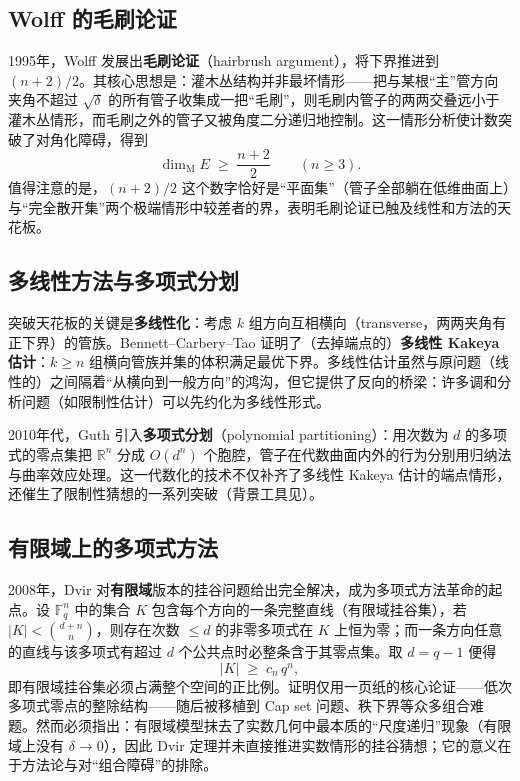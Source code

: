 \subsection{Wolff 的毛刷论证}

1995年，Wolff 发展出\textbf{毛刷论证}（hairbrush argument），将下界推进到 $(n+2)/2$\cite{wolff1995}。其核心思想是：灌木丛结构并非最坏情形——把与某根“主”管方向夹角不超过 $\sqrt{\delta}$ 的所有管子收集成一把“毛刷”，则毛刷内管子的两两交叠远小于灌木丛情形，而毛刷之外的管子又被角度二分递归地控制。这一情形分析使计数突破了对角化障碍，得到
\begin{equation}
    \dim_{\mathrm{M}} E \;\ge\; \frac{n+2}{2} \qquad (n \ge 3).
\end{equation}
值得注意的是，$(n+2)/2$ 这个数字恰好是“平面集”（管子全部躺在低维曲面上）与“完全散开集”两个极端情形中较差者的界，表明毛刷论证已触及线性和方法的天花板。

\subsection{多线性方法与多项式分划}

突破天花板的关键是\textbf{多线性化}：考虑 $k$ 组方向互相横向（transverse，两两夹角有正下界）的管族。Bennett--Carbery--Tao 证明了（去掉端点的）\textbf{多线性 Kakeya 估计}\cite{bct2011}：$k \ge n$ 组横向管族并集的体积满足最优下界。多线性估计虽然与原问题（线性的）之间隔着“从横向到一般方向”的鸿沟，但它提供了反向的桥梁：许多调和分析问题（如限制性估计）可以先约化为多线性形式。

2010年代，Guth 引入\textbf{多项式分划}（polynomial partitioning）：用次数为 $d$ 的多项式的零点集把 $\mathbb{R}^n$ 分成 $O(d^n)$ 个胞腔，管子在代数曲面内外的行为分别用归纳法与曲率效应处理。这一代数化的技术不仅补齐了多线性 Kakeya 估计的端点情形\cite{guth2018}，还催生了限制性猜想的一系列突破（背景工具见\cite{grafakos2014classical}）。

\subsection{有限域上的多项式方法}

2008年，Dvir 对\textbf{有限域}版本的挂谷问题给出完全解决，成为多项式方法革命的起点\cite{dvir2009}。设 $\mathbb{F}_q^n$ 中的集合 $K$ 包含每个方向的一条完整直线（有限域挂谷集），若 $|K| < \binom{d + n}{n}$，则存在次数 $\le d$ 的非零多项式在 $K$ 上恒为零；而一条方向任意的直线与该多项式有超过 $d$ 个公共点时必整条含于其零点集。取 $d = q - 1$ 便得
\begin{equation}
    |K| \;\ge\; c_n \, q^n ,
\end{equation}
即有限域挂谷集必须占满整个空间的正比例。证明仅用一页纸的核心论证——低次多项式零点的整除结构——随后被移植到 Cap set 问题\cite{ellenberggijswijt2017}、秩下界等众多组合难题。然而必须指出：有限域模型抹去了实数几何中最本质的“尺度递归”现象（有限域上没有 $\delta \to 0$），因此 Dvir 定理并未直接推进实数情形的挂谷猜想；它的意义在于方法论与对“组合障碍”的排除。

